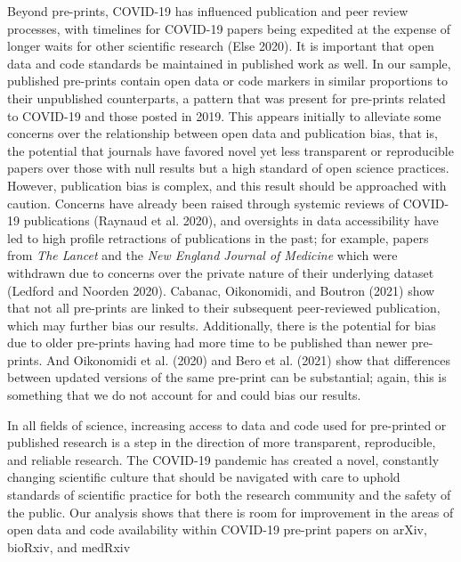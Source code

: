 \documentclass[
]{article}
\begin{document}
Beyond pre-prints, COVID-19 has influenced publication and peer review processes, with timelines for COVID-19 papers being expedited at the expense of longer waits for other scientific research (Else 2020). It is important that open data and code standards be maintained in published work as well. In our sample, published pre-prints contain open data or code markers in similar proportions to their unpublished counterparts, a pattern that was present for pre-prints related to COVID-19 and those posted in 2019. This appears initially to alleviate some concerns over the relationship between open data and publication bias, that is, the potential that journals have favored novel yet less transparent or reproducible papers over those with null results but a high standard of open science practices. However, publication bias is complex, and this result should be approached with caution. Concerns have already been raised through systemic reviews of COVID-19 publications (Raynaud et al. 2020), and oversights in data accessibility have led to high profile retractions of publications in the past; for example, papers from \emph{The Lancet} and the \emph{New England Journal of Medicine} which were withdrawn due to concerns over the private nature of their underlying dataset (Ledford and Noorden 2020). Cabanac, Oikonomidi, and Boutron (2021) show that not all pre-prints are linked to their subsequent peer-reviewed publication, which may further bias our results. Additionally, there is the potential for bias due to older pre-prints having had more time to be published than newer pre-prints. And Oikonomidi et al. (2020) and Bero et al. (2021) show that differences between updated versions of the same pre-print can be substantial; again, this is something that we do not account for and could bias our results.

In all fields of science, increasing access to data and code used for pre-printed or published research is a step in the direction of more transparent, reproducible, and reliable research. The COVID-19 pandemic has created a novel, constantly changing scientific culture that should be navigated with care to uphold standards of scientific practice for both the research community and the safety of the public. Our analysis shows that there is room for improvement in the areas of open data and code availability within COVID-19 pre-print papers on arXiv, bioRxiv, and medRxiv
\end{document}
